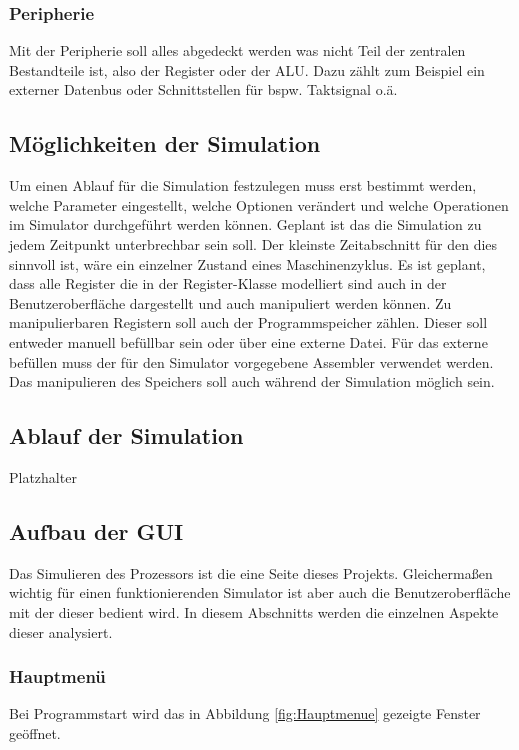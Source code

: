 \documentclass[12pt]{article}
\begin{document}
\subsubsection{Peripherie}
Mit der Peripherie soll alles abgedeckt werden was nicht Teil der zentralen Bestandteile ist, also der Register oder der ALU. Dazu zählt zum Beispiel ein externer Datenbus oder Schnittstellen für bspw. Taktsignal o.ä.

\subsection{Möglichkeiten der Simulation}
Um einen Ablauf für die Simulation festzulegen muss erst bestimmt werden, welche Parameter eingestellt, welche Optionen verändert und welche Operationen im Simulator durchgeführt werden können. Geplant ist das die Simulation zu jedem Zeitpunkt unterbrechbar sein soll. Der kleinste Zeitabschnitt für den dies sinnvoll ist, wäre ein einzelner Zustand eines Maschinenzyklus. Es ist geplant, dass alle Register die in der Register-Klasse modelliert sind auch in der Benutzeroberfläche dargestellt und auch manipuliert werden können. Zu manipulierbaren Registern soll auch der Programmspeicher zählen. Dieser soll entweder manuell befüllbar sein oder über eine externe Datei. Für das externe befüllen muss der für den Simulator vorgegebene Assembler verwendet werden. Das manipulieren des Speichers soll auch während der Simulation möglich sein.

\subsection{Ablauf der Simulation}
Platzhalter

\subsection{Aufbau der GUI}
\label{chp:AufbauGUI}
Das Simulieren des Prozessors ist die eine Seite dieses Projekts. Gleichermaßen wichtig für einen funktionierenden Simulator ist aber auch die Benutzeroberfläche mit der dieser bedient wird. In diesem Abschnitts werden die einzelnen Aspekte dieser analysiert.
\subsubsection{Hauptmenü}
Bei Programmstart wird das in Abbildung \ref{fig:Hauptmenue} gezeigte Fenster geöffnet.\vspace{10pt}
\end{document}
